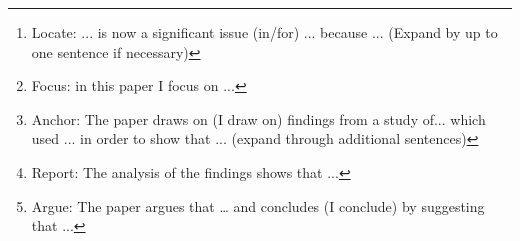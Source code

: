 \begin{abstract}
\footnote{Locate: ... is now a significant issue (in/for) ... because ... (Expand by up to one sentence if necessary)}Adaptive bandwidth kernel density estimators (AB-KDEs) have received attention from the academic community due to an analytical promise of increased performance over classical estimators. 
\footnote{Focus: in this paper I focus on ... }However, the field is fragmented and there exists no comprehensive comparison of the existing state-of-the-art AB-KDEs.
\footnote{Anchor: The paper draws on (I draw on) findings from a study of... which used ... in order to show that ... (expand through additional sentences)}We provide a comparison of some state-of-the-art and classical AB-KDE methods as well a computational framework along with a novel implementation of a full principal axes rotation hyper-ellipsoid variant of the $k$-Nearest Neighbours algorithm.
\footnote{Report: The analysis of the findings shows that ...}The extensive experimental results show that the fixed bandwidth rule-of-thumb methods achieve satisfactory results. Further, the balloon estimators are shown to be superior in the higher dimensional spaces, with higher modes or with data on non-linear manifolds. The sample point estimators show additional utility when data are scarce in low dimensions.
\footnote{Argue: The paper argues that … and concludes (I conclude) by suggesting that ...}The experimental results lead us to conclude that balloon estimators such as the full rotation hyper-ellipsoid estimator will have a significant impact on data analysis algorithms which depend upon an underlying density estimates with larger volumes of higher dimensional data.

\end{abstract}
